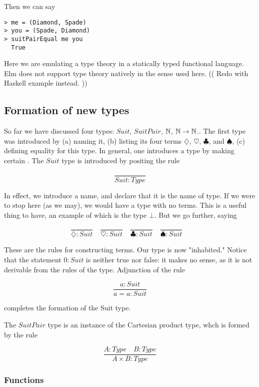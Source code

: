 Then we can say

\begin{verbatim}
> me = (Diamond, Spade)
> you = (Spade, Diamond)
> suitPairEqual me you
  True
\end{verbatim}

Here we are emulating a type theory in a statically typed functional language.  Elm does not support type theory natively in the sense used here.  (( Redo with Haskell example instead. ))

\subsection{Formation of new types}

So far we have discussed four types: $Suit$, $SuitPair$, $\mathbb{N}$, $\mathbb{N} \to \mathbb{N}$..  The first type was introduced by (a) naming it, (b) listing its four terms $\diamondsuit$, $\heartsuit$, $\clubsuit$, and $\spadesuit$, (c) defining equality for this type.  In general, one introduces a type by making certain .  The $Suit$ type is introduced by positing the rule

$$
\frac{}{Suit : Type}
$$

In effect, we introduce a name, and declare that it is the name of type.  If we were to stop here (as we may), we would have a type with no terms.  This is a useful thing to have, an example of which is the type $\bot$.  But we go further, saying

$$
\frac{}{\diamondsuit : Suit} \quad
\frac{}{\heartsuit : Suit} \quad
\frac{}{\clubsuit : Suit} \quad
\frac{}{\spadesuit : Suit} \quad
$$

These are the rules for constructing terms.  Our type is now "inhabited."
Notice that the statement $0 : Suit$  is neither true nor false: it makes no sense, as it is not derivable from the rules of the type. Adjunction of the rule

$$
\frac{a : Suit}{a = a : Suit}
$$

completes the formation of the Suit type.

The $SuitPair$ type is an instance of the Cartesian product type, whch is formed by the rule

\begin{equation}
\frac{A : Type \quad B : Type}{A\times B : Type}
\end{equation}


\subsubsection{Functions}

